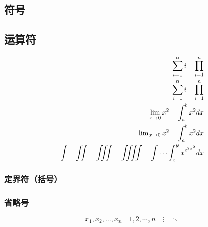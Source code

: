 \documentclass[UTF8]{ctexart}
\begin{document}
 \subsection{符号}
 \subsection{运算符}
     \begin{align}
         \sum_{i=1}^n i \quad \prod_{i=1}^n                      \\
         \sum\limits_{i=1}^n i \quad \prod\limits_{i=1}^n        \\
         \lim_{x\to0}x^2 \quad \int_a^b x^2 dx                   \\
         \lim\nolimits_{x\to0}x^2 \quad \int\nolimits_a^b x^2 dx \\
         \int\quad \iint \quad \iiint \quad \iiiint \quad \idotsint_x^y x^{e^{2\pi^2}} dx
     \end{align}
     \subsubsection{定界符（括号）}
     \subsubsection{省略号}
         \[ x_1,x_2,\dots ,x_n\quad 1,2,\cdots ,n\quad
             \vdots\quad \ddots \]
\end{document}
